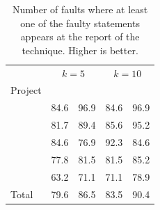 \documentclass{article}
\begin{document}
%

\begin{table}[tb]
	\small
	\setlength{\tabcolsep}{3pt}
	\centering
\begin{tabular}{l|rr|rr}
		 \toprule
       & \multicolumn{2}{c|}{$k=5$} & \multicolumn{2}{c}{$k=10$} \\
		 Project        &   \sfl{}   & \comb &   \sfl{}   & \comb\\
		\midrule
		 \lang{}         &   84.6   & 96.9 & 84.6 & 96.9  \\
		\cmath{}           & 81.7 & 89.4 & 85.6 & 95.2 \\
		\chart{}           & {\cellcolor{Gray} 84.6} & {\cellcolor{Gray}76.9} & {\cellcolor{Gray}92.3} & {\cellcolor{Gray}84.6}\\
		\jtime{}           & 77.8 & 81.5 & 81.5 & 85.2\\
		\mockito{}           & 63.2 & 71.1 & 71.1 & 78.9\\   \midrule
		Total         & 79.6 & 86.5 & 83.5 & 90.4\\
		\bottomrule
	\end{tabular}
  \caption {Number of faults where at least one of the faulty
    statements appears at the report of the technique. Higher is better.}
  \label{table:fsws}
\end{table}
\end{document}
